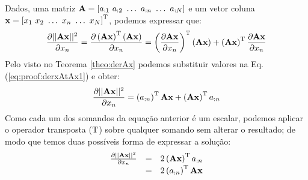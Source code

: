 \begin{myproofT}\label{proof:theo:derxAtAx}
Dados,
uma matriz $\MATRIX{A}=\left[a_{:1}~ a_{:2}~ \hdots~ a_{:n}~ \hdots~ a_{:N}\right]$ e 
um vetor coluna $\VECTOR{x}=\left[x_{1}~ x_{2}~ \hdots~ x_{n}~ \hdots~ x_{N}\right]^{\transpose}$, 
podemos expressar que:
\begin{equation}\label{eq:proof:derxAtAx1}
\frac{\partial ||\MATRIX{A}\VECTOR{x}||^{2}}{\partial x_n}=
\frac{\partial \left(\MATRIX{A}\VECTOR{x}\right)^{\transpose}\left(\MATRIX{A}\VECTOR{x}\right)}{\partial x_n}=
\left(\frac{\partial \MATRIX{A}\VECTOR{x}}{\partial x_n}\right)^{\transpose}\left(\MATRIX{A}\VECTOR{x}\right)+
\left(\MATRIX{A}\VECTOR{x}\right)^{\transpose} \frac{\partial \MATRIX{A}\VECTOR{x}}{\partial x_n}
\end{equation}
Pelo visto no Teorema \ref{theo:derAx} podemos substituir valores na Eq. (\ref{eq:proof:derxAtAx1})
e obter:
\begin{equation}\label{eq:proof:derxAtAx2}
\frac{\partial ||\MATRIX{A}\VECTOR{x}||^{2}}{\partial x_n}=
\left(a_{:n}\right)^{\transpose} \MATRIX{A}\VECTOR{x} +
\left(\MATRIX{A}\VECTOR{x}\right)^{\transpose} a_{:n}
\end{equation}
Como cada um dos somandos da equação anterior é um escalar, podemos aplicar o operador
transposta ($\mathrm{T}$) sobre qualquer somando sem alterar o resultado; de modo que temos duas possíveis
forma de expressar a solução:
\begin{equation}
\begin{matrix}
\frac{\partial ||\MATRIX{A}\VECTOR{x}||^2 }{\partial x_n}&=&
2\left(\MATRIX{A}\VECTOR{x}\right)^{\transpose}a_{:n}\\
~&=& 2\left(a_{:n}\right)^{\transpose}\MATRIX{A}\VECTOR{x}
\end{matrix}
\end{equation}
\end{myproofT}

